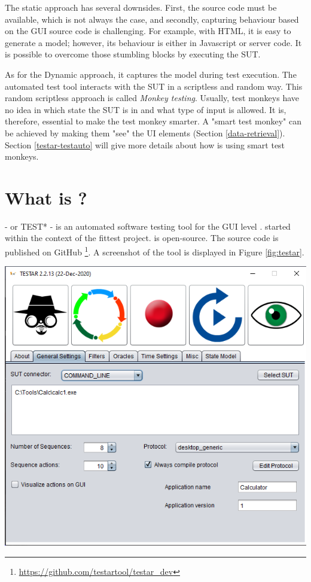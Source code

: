 The static approach has several downsides. First, the source code must be available, which is not always the case, and secondly, capturing behaviour based on the GUI source code is challenging. For example, with HTML, it is easy to generate a model; however, its behaviour is either in Javascript or server code.  It is possible to overcome those stumbling blocks by executing the SUT.
    
As for the Dynamic approach, it captures the model during test execution. The automated test tool interacts with the SUT in a scriptless and random way. This random scriptless approach is called \emph{Monkey testing}. Usually, test monkeys have no idea in which state the SUT is in and what type of input is allowed. It is, therefore, essential to make the test monkey smarter. A "smart test monkey" can be achieved by making them "see" the UI elements (Section \ref{data-retrieval}). Section \ref{testar-testauto} will give more details about how \testar is using smart test monkeys.

\section{What is \testar?} \label{what-is-testar}
\testar - or TEST* - is an automated software testing tool for the GUI level \cite{testar-about}. \testar started within the context of the \acrfull{fittest} project. \testar is open-source. The source code is published on GitHub \footnote{ \url{https://github.com/testartool/testar\_dev}}. A screenshot of the \testar tool is displayed in Figure \ref{fig:testar}.

\bigskip
\begingroup
\captionsetup{type=figure}
\includegraphics[scale=0.5]{images/testar.png}
\label{fig:testar}
\endgroup

